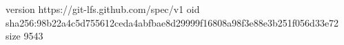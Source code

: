 version https://git-lfs.github.com/spec/v1
oid sha256:98b22a4c5d755612ceda4abfbae8d29999f16808a98f3e88e3b251f056d33e72
size 9543
